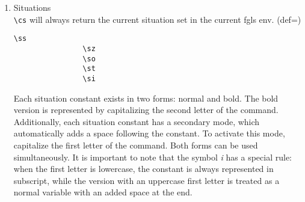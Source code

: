 \documentclass[10pt, a4paper]{article}
\begin{document}
\begin{enumerate}
\begin{center}
\begin{minipage}[h][8cm][t]{15em}
\begin{fgls}
					\bZ\\
					\bi\\
					\bI\\
					\bs\\
					\bS\\
					\br\\
					\bR\\
					\bp\\
					\bP\\
					\bq\\
					\bQ\\
					\be\\
					\bE
				\end{fgls}
			\end{minipage}
		\end{center}
		\item Situations
		\\\verb=\cs= will always return the current situation set in the current fgls env. (def=\sstar)
		\begin{center}
			\begin{minipage}[h][2.5cm][t]{15em}
				\begin{lstlisting}[style=B]
				\ss
				\sz
				\so
				\st
				\si
				\end{lstlisting}
			\end{minipage}
			\begin{minipage}[h][2.5cm][t]{15em}
				\begin{fgls}
					\ \\
					\ss\\
					\sz\\
					\so\\
					\st\\
					\si
				\end{fgls}
			\end{minipage}
		\end{center}
		Each situation constant exists in two forms: normal and bold. The bold version is represented by capitalizing the second letter of the command. Additionally, each situation constant has a secondary mode, which automatically adds a space following the constant. To activate this mode, capitalize the first letter of the command. Both forms can be used simultaneously. It is important to note that the symbol \textit{i} has a special rule: when the first letter is lowercase, the constant is always represented in subscript, while the version with an uppercase first letter is treated as a normal variable with an added space at the end.
	\end{enumerate}
\end{document}
